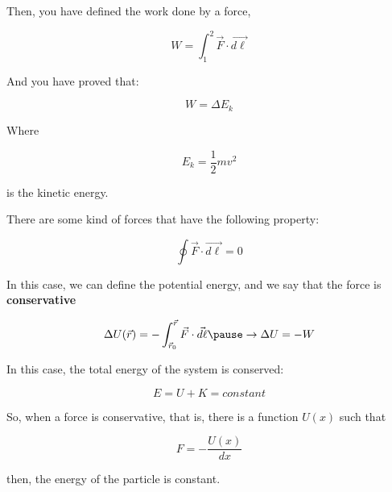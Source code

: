\documentclass[]{beamer}
\begin{document}




\begin{frame}

Then, you have defined the work done by a force,

\begin{equation}
  W=\int^2_1\vec{F}\cdot \vec{d\ell}
\end{equation}

\pause

And you have proved that:

\begin{equation}
  W=\Delta E_k
\end{equation}
\pause

Where

\begin{equation}
  E_k=\frac{1}{2}mv^2
\end{equation}

is the kinetic energy.
\end{frame}


\begin{frame}

 There are some kind of forces that have the following property: 

 \begin{equation}
  \oint\vec{F}\cdot \vec{d\ell}=0
\end{equation}

\pause
In this case, we can define the potential energy, and we say that the force is \textbf{conservative}


\begin{equation}
  \Delta U(\vec{r})=-\int^{\vec{r}}_{\vec{r}_0}\vec{F}\cdot \vec{d\ell}\pause \rightarrow \Delta U=-W
\end{equation}

\pause

In this case, the total energy of the system is conserved:
\pause

\begin{equation}
 E=U+K=constant
\end{equation}

\end{frame}
  


\begin{frame}

So, when a force is conservative, that is, there is a function $U(x)$ such that

\begin{equation}
  F=-\frac{U(x)}{dx}
\end{equation}
 
then, the energy of the particle is constant. 


 \end{frame}
   
\end{document}

